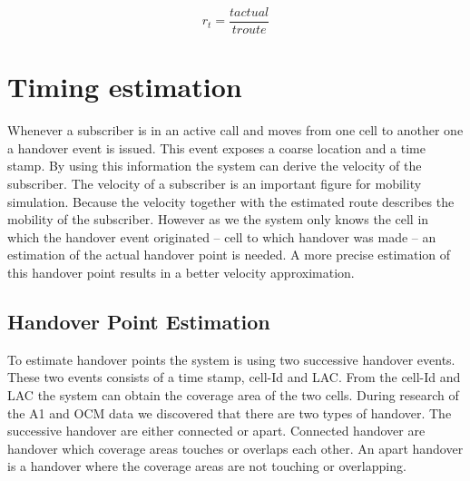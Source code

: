 \documentclass[master,english]{hgbthesis}
\begin{document}
\begin{equation}

	r_{t}=\frac{t{actual}}{t{route}}

	\label{eq:timeratio}

\end{equation} 

\section{Timing estimation}

\label{sec:timing-estimation}

Whenever a subscriber is in an active call and moves from one cell to another one a handover event is issued. This event exposes a coarse location and a time stamp. By using this information the system can derive the velocity of the subscriber. The velocity of a subscriber is an important figure for mobility simulation. Because the velocity together with the estimated route describes the mobility of the subscriber. However as we the system only knows the cell in which the handover event originated -- cell to which handover was made -- an estimation of the actual handover point is needed. A more precise estimation of this handover point results in a better velocity approximation.

\subsection{Handover Point Estimation}

To estimate handover points the system is using two successive handover events. These two events consists of a time stamp, cell-Id and LAC. From the cell-Id and LAC the system can obtain the coverage area of the two cells. During research of the A1 and OCM data we discovered that there are two types of handover. The successive handover are either connected or apart. Connected handover are handover which coverage areas touches or overlaps each other. An apart handover is a handover where the coverage areas are not touching or overlapping.
\end{document}
